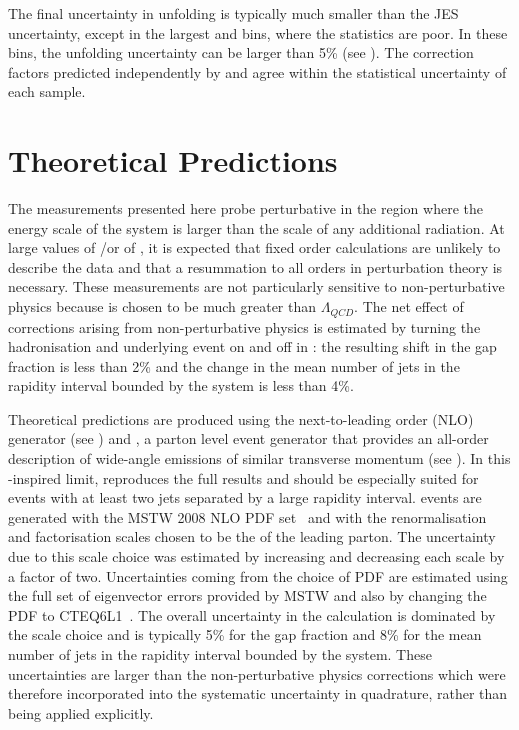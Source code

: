 The final uncertainty in unfolding is typically much smaller than the JES uncertainty, except
in the largest \pTbar and \DeltaY bins, where the \MC statistics are poor. In these bins,
the unfolding uncertainty can be larger than 5\% (see ).
The correction factors predicted independently by \Herwigpp and \Alpgen agree within the statistical uncertainty of each sample.

\section{Theoretical Predictions}
The measurements presented here probe perturbative \QCD in the region where the energy
scale of the \dijet system is larger than the scale of any additional radiation. At large values of
\pTbar/\Qnought or of \DeltaY, it is expected that fixed order calculations are unlikely to describe the data and
that a resummation to all orders in perturbation theory is necessary. These measurements are not
particularly sensitive to non-perturbative physics because \Qnought is chosen to be much greater than
$\Lambda_{QCD}$. The net effect of corrections arising from non-perturbative physics is estimated by turning the
hadronisation and underlying event on and off in \Pythia: the resulting shift in the gap fraction
is less than 2\% and the change in the mean number of jets in the rapidity interval bounded by
the \dijet system is less than 4\%.

Theoretical predictions are produced using the next-to-leading order (NLO) \Powheg generator (see )
and \HEJ, a parton level event generator that provides an all-order description of wide-angle emissions
of similar transverse momentum (see ). In this \BFKL-inspired limit, \HEJ reproduces the full \QCD results
and should be especially suited for events with at least two jets separated by a large rapidity interval. \HEJ
events are generated with the MSTW 2008 NLO PDF set~\cite{Martin:2009:lhcpartons,Sherstnev:2008:LOMC}
and with the renormalisation and factorisation scales chosen to be the \pT of the leading parton. The uncertainty
due to this scale choice was estimated by increasing and decreasing each scale by a factor of two.
Uncertainties coming from the choice of PDF are estimated using the full set of eigenvector errors provided
by MSTW and also by changing the PDF to CTEQ6L1~\cite{Pumplin:2002:CTEQ6L1}. The overall uncertainty in the \HEJ
calculation is dominated by the scale choice and is typically 5\% for the gap fraction and 8\% for
the mean number of jets in the rapidity interval bounded by the \dijet system. These uncertainties
are larger than the non-perturbative physics corrections which were therefore incorporated
into the systematic uncertainty in quadrature, rather than being applied explicitly.

